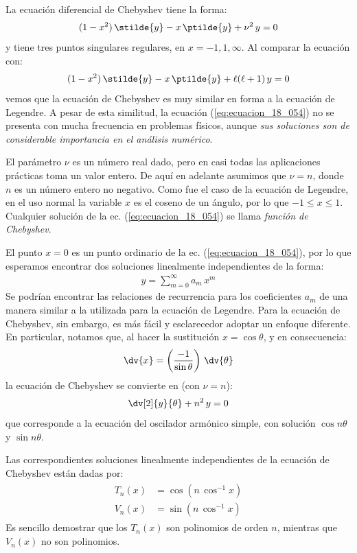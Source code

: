 La ecuación diferencial de Chebyshev tiene la forma:
\begin{align}
(1 - x^{2}) \, \stilde{y} - x \, \ptilde{y} + \nu^{2} \, y
 = 0
 \label{eq:ecuacion_18_054}
\end{align}
y tiene tres puntos singulares regulares, en $x = -1, 1, \infty$. Al comparar la ecuación con:
\begin{align*}
(1 - x^{2}) \, \stilde{y} - x \, \ptilde{y} + \ell (\ell + 1) \, y = 0
\end{align*}
vemos que la ecuación de Chebyshev es muy similar en forma a la ecuación de Legendre. A pesar de esta similitud, la ecuación (\ref{eq:ecuacion_18_054}) no se presenta con mucha frecuencia en problemas físicos, aunque \emph{sus soluciones son de considerable importancia en el análisis numérico}.
\par
El parámetro $\nu$ es un número real dado, pero en casi todas las aplicaciones prácticas toma un valor entero. De aquí en adelante asumimos que $\nu = n$, donde $n$ es un número entero no negativo. Como fue el caso de la ecuación de Legendre, en el uso normal la variable $x$ es el coseno de un ángulo, por lo que $-1 \leq x \leq 1$. Cualquier solución de la ec. (\ref{eq:ecuacion_18_054}) se llama \emph{función de Chebyshev}.
\par
El punto $x = 0$ es un punto ordinario de la ec. (\ref{eq:ecuacion_18_054}), por lo que esperamos encontrar
dos soluciones linealmente independientes de la forma:
\begin{align*}
y = \sum_{m=0}^{\infty} a_{m} \, x^{m}
\end{align*}
Se podrían encontrar las relaciones de recurrencia para los coeficientes $a_{m}$ de una manera similar a la utilizada para la ecuación de Legendre. Para la ecuación de Chebyshev, sin embargo, es más fácil y esclarecedor adoptar un enfoque diferente. En particular, notamos que, al hacer la sustitución $x = \cos \theta$, y en consecuencia:
\begin{align*}
\dv{x} = \left( \dfrac{-1}{\sin \theta} \right) \, \dv{\theta}
\end{align*}
la ecuación de Chebyshev se convierte en (con $\nu = n$):
\begin{align*}
\dv[2]{y}{\theta} + n^{2} \, y = 0
\end{align*}
que corresponde a la ecuación del oscilador armónico simple, con solución $\cos n \theta$ y $\sin n \theta$. 
\par
Las correspondientes soluciones linealmente independientes de la ecuación de Chebyshev están dadas por:
\begin{align}
\begin{aligned}
T_{n} (x) &= \cos (n \, \cos^{-1} x) \\[0.5em]
V_{n} (x) &= \sin (n \, \cos^{-1} x)
\end{aligned}
\label{eq:ecuacion_18_055}
\end{align}
Es sencillo demostrar que los $T_{n} (x)$ son polinomios de orden $n$, mientras que $V_{n} (x)$ no son polinomios.

